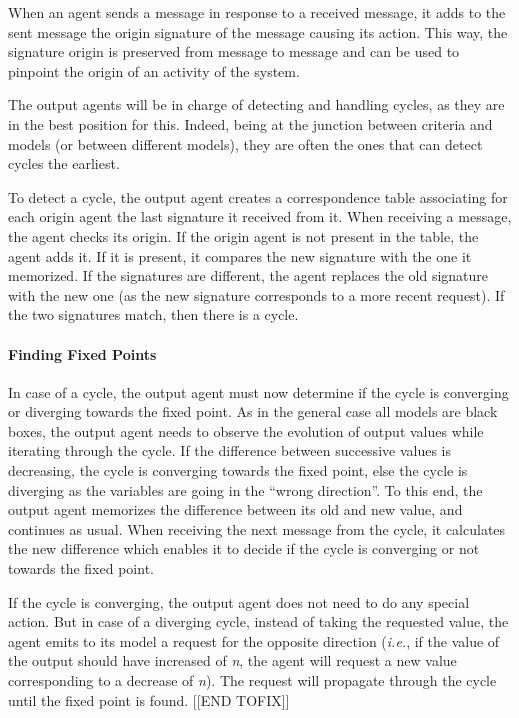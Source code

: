 When an agent sends a message in response to a received message, it adds to the sent message the origin signature of the message causing its action. This way, the signature origin is preserved from message to message and can be used to pinpoint the origin of an activity of the system.

The output agents will be in charge of detecting and handling cycles, as they are in the best position for this. Indeed, being at the junction between criteria and models (or between different models), they are often the ones that can detect cycles the earliest.

To detect a cycle, the output agent creates a correspondence table associating for each origin agent the last signature it received from it. When receiving a message, the agent checks its origin. If the origin agent is not present in the table, the agent adds it. If it is present, it compares the new signature with the one it memorized. If the signatures are different, the agent replaces the old signature with the new one (as the new signature corresponds to a more recent request). If the two signatures match, then there is a cycle.

\paragraph*{Finding Fixed Points}
In case of a cycle, the output agent must now determine if the cycle is converging or diverging towards the fixed point. As in the general case all models are black boxes, the output agent needs to observe the evolution of output values while iterating through the cycle. If the difference between successive values is decreasing, the cycle is converging towards the fixed point, else the cycle is diverging as the variables are going in the \enquote{wrong direction}. To this end, the output agent memorizes the difference between its old and new value, and continues as usual. When receiving the next message from the cycle, it calculates the new difference which enables it to decide if the cycle is converging or not towards the fixed point.

If the cycle is converging, the output agent does not need to do any special action. But in case of a diverging cycle, instead of taking the requested value, the agent emits to its model a request for the opposite direction (\emph{i.e.}, if the value of the output should have increased of \emph{n}, the agent will request a new value corresponding to a decrease of \emph{n}). The request will propagate through the cycle until the fixed point is found.
[[END TOFIX]]


